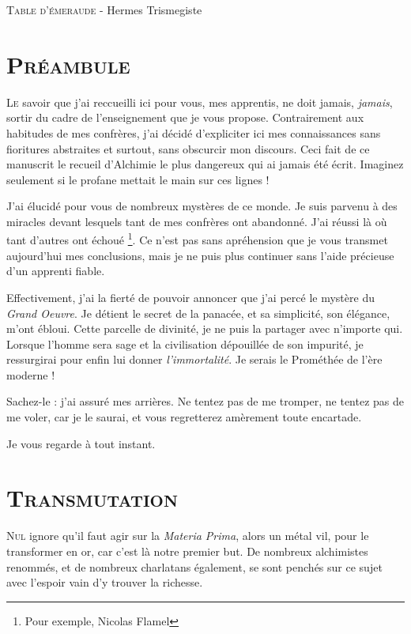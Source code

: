 \textsc{Table d'émeraude} - Hermes Trismegiste

\newpage

\section{\textsc{Préambule}}

\lettrine{L}{e} savoir que j'ai reccueilli ici pour vous, mes apprentis, ne doit jamais,
\emph{jamais}, sortir du cadre de l'enseignement que je vous propose.
Contrairement aux habitudes de mes confrères, j'ai décidé d'expliciter ici mes
connaissances sans fioritures abstraites et surtout, sans obscurcir mon
discours. Ceci fait de ce manuscrit le recueil d'Alchimie le plus dangereux qui
ai jamais été écrit. Imaginez seulement si le profane mettait le main sur ces
lignes !

J'ai élucidé pour vous de nombreux mystères de ce monde. Je suis parvenu à des
miracles devant lesquels tant de mes confrères ont abandonné. J'ai réussi là où
tant d'autres ont échoué \footnote{Pour exemple, Nicolas Flamel}. Ce n'est pas
sans apréhension que je vous transmet aujourd'hui mes conclusions, mais je ne puis
plus continuer sans l'aide précieuse d'un apprenti fiable.

Effectivement, j'ai la fierté de pouvoir annoncer que j'ai percé le mystère du
\emph{Grand Oeuvre}. Je détient le secret de la panacée, et sa simplicité, son
élégance, m'ont ébloui. Cette parcelle de divinité, je ne puis la partager avec
n'importe qui. Lorsque l'homme sera sage et la civilisation dépouillée de son
impurité, je ressurgirai pour enfin lui donner \emph{l'immortalité}. Je serais
le Prométhée de l'ère moderne !

Sachez-le : j'ai assuré mes arrières. Ne tentez pas de me tromper, ne tentez
pas de me voler, car je le saurai, et vous regretterez amèrement toute
encartade.

Je vous regarde à tout instant.

\section{\textsc{Transmutation}}

\lettrine{N}{ul} ignore qu'il faut agir sur la \emph{Materia Prima}, alors un métal vil,
pour le transformer en or, car c'est là notre premier but. De nombreux
alchimistes renommés, et de nombreux charlatans également, se sont penchés sur
ce sujet avec l'espoir vain d'y trouver la richesse.


